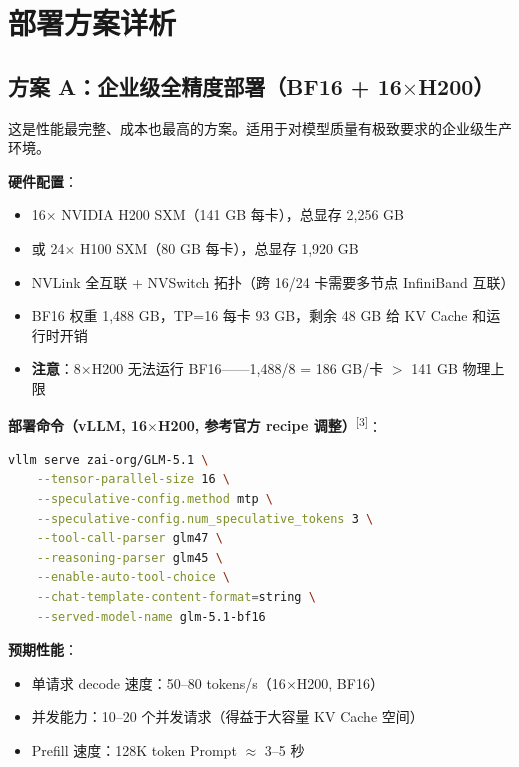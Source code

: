 \documentclass[UTF8,a4paper,10pt,oneside]{ctexart}
\begin{document}

\section{部署方案详析}

\subsection{方案 A：企业级全精度部署（BF16 + 16$\times$H200）}

这是性能最完整、成本也最高的方案。适用于对模型质量有极致要求的企业级生产环境。

\textbf{硬件配置}：
\begin{itemize}
    \item 16$\times$ NVIDIA H200 SXM（141 GB 每卡），总显存 2,256 GB
    \item 或 24$\times$ H100 SXM（80 GB 每卡），总显存 1,920 GB
    \item NVLink 全互联 + NVSwitch 拓扑（跨 16/24 卡需要多节点 InfiniBand 互联）
    \item BF16 权重 1,488 GB，TP=16 每卡 93 GB，剩余 48 GB 给 KV Cache 和运行时开销
    \item \textbf{注意}：8$\times$H200 无法运行 BF16——1,488/8 = 186 GB/卡 $>$ 141 GB 物理上限
\end{itemize}

\textbf{部署命令（vLLM, 16$\times$H200, 参考官方 recipe 调整）}\textsuperscript{[3]}：
\begin{lstlisting}[language=bash]
vllm serve zai-org/GLM-5.1 \
    --tensor-parallel-size 16 \
    --speculative-config.method mtp \
    --speculative-config.num_speculative_tokens 3 \
    --tool-call-parser glm47 \
    --reasoning-parser glm45 \
    --enable-auto-tool-choice \
    --chat-template-content-format=string \
    --served-model-name glm-5.1-bf16
\end{lstlisting}

\textbf{预期性能}：
\begin{itemize}
    \item 单请求 decode 速度：50--80 tokens/s（16$\times$H200, BF16）
    \item 并发能力：10--20 个并发请求（得益于大容量 KV Cache 空间）
    \item Prefill 速度：128K token Prompt $\approx$ 3--5 秒
\end{itemize}
\end{document}
